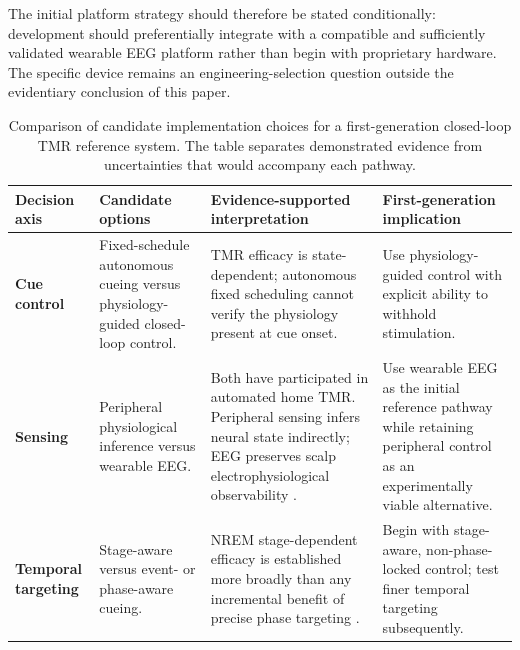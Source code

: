 The initial platform strategy should therefore be stated conditionally:
development should preferentially integrate with a compatible and sufficiently
validated wearable EEG platform rather than begin with proprietary hardware.
The specific device remains an engineering-selection question outside the
evidentiary conclusion of this paper.


\begin{table}[t]

\centering

\caption{
Comparison of candidate implementation choices for a first-generation
closed-loop TMR reference system. The table separates demonstrated evidence
from uncertainties that would accompany each pathway.
}

\label{tab:implementation_tradeoffs}

\footnotesize
\setlength{\tabcolsep}{4.5pt}
\renewcommand{\arraystretch}{1.22}

\begin{tabularx}{\textwidth}{
@{}
>{\raggedright\arraybackslash}p{2.5cm}
>{\raggedright\arraybackslash}X
>{\raggedright\arraybackslash}X
>{\raggedright\arraybackslash}X
@{}
}

\toprule

\textbf{Decision axis}
&
\textbf{Candidate options}
&
\textbf{Evidence-supported interpretation}
&
\textbf{First-generation implication}
\\

\midrule

\textbf{Cue control}
&
Fixed-schedule autonomous cueing versus physiology-guided closed-loop control.
&
TMR efficacy is state-dependent; autonomous fixed scheduling cannot verify the
physiology present at cue onset.
&
Use physiology-guided control with explicit ability to withhold stimulation.
\\

\addlinespace[1.2mm]

\textbf{Sensing}
&
Peripheral physiological inference versus wearable EEG.
&
Both have participated in automated home TMR. Peripheral sensing infers neural
state indirectly; EEG preserves scalp electrophysiological observability
\citep{whitmore2022improving,salfi2025promoting}.
&
Use wearable EEG as the initial reference pathway while retaining peripheral
control as an experimentally viable alternative.
\\

\addlinespace[1.2mm]

\textbf{Temporal targeting}
&
Stage-aware versus event- or phase-aware cueing.
&
NREM stage-dependent efficacy is established more broadly than any incremental
benefit of precise phase targeting
\citep{hu2020promoting,antony2018spindle}.
&
Begin with stage-aware, non-phase-locked control; test finer temporal targeting
subsequently.
\\


\end{tabularx}
\end{table}
